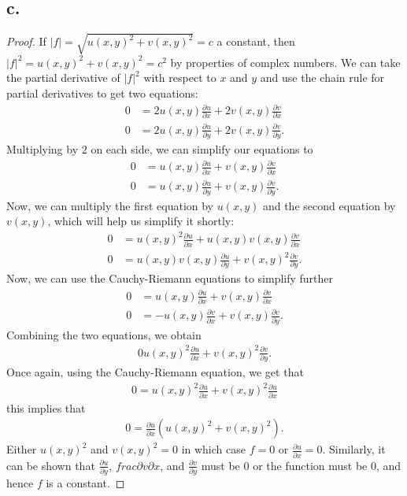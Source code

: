 \documentclass{article}
\begin{document}
\subsection*{c.}
\begin{proof}
    If $|f| = \sqrt{u(x, y)^2 + v(x, y)^2} = c$ a constant, then $|f|^2 = u(x,y)^2 + v(x,y)^2 = c^2$ by properties of complex numbers. We can take the partial derivative of $|f|^2$ with respect to $x$ and $y$ and use the chain rule for partial derivatives to get two equations:
    \begin{align*}
        0 &= 2u(x, y)\frac{\partial u}{\partial x} + 2v(x, y)\frac{\partial v}{\partial x}\\
        0 &= 2u(x, y)\frac{\partial u}{\partial y} + 2v(x, y)\frac{\partial v}{\partial y}.
    \end{align*}
Multiplying by $2$ on each side, we can simplify our equations to 
\begin{align*}
    0 &= u(x, y)\frac{\partial u}{\partial x} + v(x, y)\frac{\partial v}{\partial x}\\
    0 &= u(x, y)\frac{\partial u}{\partial y} + v(x, y)\frac{\partial v}{\partial y}.
\end{align*}
Now, we can multiply the first equation by $u(x, y)$ and the second equation by $v(x, y)$, which will help us simplify it shortly:
\begin{align*}
    0 &= u(x, y)^2\frac{\partial u}{\partial x} + u(x,y)v(x, y)\frac{\partial v}{\partial x}\\
    0 &= u(x, y)v(x, y)\frac{\partial u}{\partial y} + v(x, y)^2\frac{\partial v}{\partial y}.
\end{align*}
Now, we can use the Cauchy-Riemann equations to simplify further
\begin{align*}
    0 &= u(x, y)\frac{\partial u}{\partial x} + v(x, y)\frac{\partial v}{\partial x}\\
    0 &= -u(x, y)\frac{\partial v}{\partial x} + v(x, y)\frac{\partial v}{\partial y}.
\end{align*}
Combining the two equations, we obtain
\begin{align*}
    0 u(x, y)^2 \frac{\partial u}{\partial x} + v(x, y)^2 \frac{\partial v}{\partial y}.
\end{align*}
Once again, using the Cauchy-Riemann equation, we get that 
\begin{align*}
    0 = u(x, y)^2\frac{\partial u}{\partial x} + v(x, y)^2 \frac{\partial u}{ \partial x}
\end{align*}
this implies that 
\begin{align*}
    0 = \frac{\partial u}{\partial x}(u(x, y)^2 + v(x,y)^2).
\end{align*}
Either $u(x, y)^2$ and $v(x, y)^2 = 0$ in which case $f = 0$ or $\frac{\partial u}{\partial x} = 0$. Similarly, it can be shown that 
$\frac{\partial u}{\partial y}$, $frac{\partial v}{\partial x}$, and $\frac{\partial v}{\partial y}$ must be $0$ or the function must be $0$, and hence $f$ is a constant. 




\end{proof}
\end{document}

